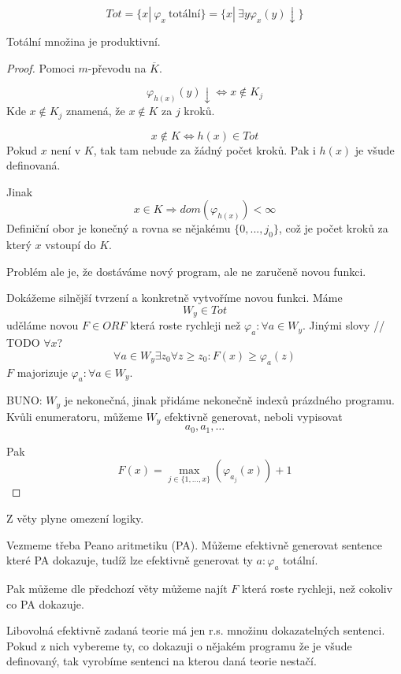 \begin{definition}\label{tot_mn}
	\[ Tot = \{ x |\ \varphi_x\ \text{totální} \} = \{ x |\ \exists y \varphi_x(y) \downarrow \} \]
\end{definition}
\begin{lemma}
	Totální množina je produktivní.
\end{lemma}
\begin{proof}
	Pomoci $m$-převodu na $\overline{K}$.

	\[ \varphi_{h(x)} (y) \downarrow \iff x \notin K_j \]
	Kde $x \notin K_j$ znamená, že $x \notin K$ za $j$ kroků.

	\[ x \notin K \iff h(x) \in Tot \]
	Pokud $x$ není v $K$, tak tam nebude za žádný počet kroků. Pak i $h(x)$ je všude definovaná.

	Jinak
	\[ x \in K \Rightarrow dom(\varphi_{h(x)}) < \infty \]
	Definiční obor je konečný a rovna se nějakému $\{ 0, ..., j_0 \}$, což je počet kroků za který $x$ vstoupí do $K$.

	Problém ale je, že dostáváme nový program, ale ne zaručeně novou funkci.

	Dokážeme silnější tvrzení a konkretně vytvoříme novou funkci.
	Máme
	\[ W_y \in Tot \]
	uděláme novou $F \in ORF$ která roste rychleji než $\varphi_a: \forall a \in W_y$.
	Jinými slovy // TODO $\forall x$?
	\[ \forall a \in W_y \exists z_0 \forall z \geq z_0: F(x) \geq \varphi_a(z) \]
	$F$ majorizuje $\varphi_a: \forall a \in W_y$.

	BUNO: $W_y$ je nekonečná, jinak přidáme nekonečně indexů prázdného programu.
	Kvůli enumeratoru, můžeme $W_y$ efektivně generovat, neboli vypisovat
	\[ a_0, a_1, \ldots \]

	Pak
	\[ F(x) = \max_{j \in \{ 1, \ldots, x \} } (\varphi_{a_j}(x)) + 1 \]
\end{proof}

\begin{consequence}
	Z věty plyne omezení logiky.

	Vezmeme třeba Peano aritmetiku (PA).
	Můžeme efektivně generovat sentence které PA dokazuje, tudíž lze efektivně generovat ty $a: \varphi_a$ totální.

	Pak můžeme dle předchozí věty můžeme najít $F$ která roste rychleji, než cokoliv co PA dokazuje.

	Libovolná efektivně zadaná teorie má jen r.s. množinu dokazatelných sentenci.
	Pokud z nich vybereme ty, co dokazuji o nějakém programu že je všude definovaný, tak vyrobíme sentenci na kterou daná teorie nestačí.
\end{consequence}

